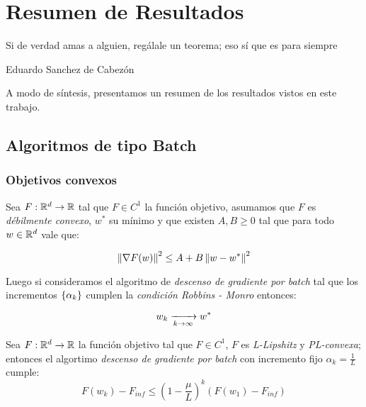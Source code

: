 \chapter{Resumen de Resultados}\label{ch:resumen}

\epigraph{Si de verdad amas a alguien, reg\'alale un teorema; eso s\'i que es para siempre}{Eduardo Sanchez de Cabez\'on}

A modo de s\'intesis, presentamos un resumen de los resultados vistos en este trabajo.

\section{Algoritmos de tipo Batch}

\subsection{Objetivos convexos}

\begin{theorem}
	Sea $F: {\mathbb{R}}^d \rightarrow {\mathbb{R}}$ tal que $F \in C^1$ la funci\'on objetivo, asumamos que $F$ es \textit{d\'ebilmente convexo}, $w^*$ su m\'inimo y que existen $A,B \geq 0$ tal que para todo $w \in {\mathbb{R}}^d$ vale que:
	
	\begin{equation*}
	\left\lVert\nabla F(w)\right\rVert^2 \leq A + B \left\lVert w - w^*\right\rVert^2
	\end{equation*}
	
	Luego si consideramos el algoritmo de \textit{descenso de gradiente por batch} tal que los incrementos $\left\lbrace\alpha_k\right\rbrace$  cumplen la \textit{condici\'on Robbins - Monro} entonces:
	
	\begin{equation*}
	w_k \xrightarrow[k \rightarrow \infty]{} w^*
	\end{equation*}
	
\end{theorem}

\begin{theorem}
	Sea $F: {\mathbb{R}}^d \rightarrow {\mathbb{R}}$ la funci\'on objetivo tal que $F \in C^1$, $F$ es \textit{L-Lipshitz} y \textit{PL-convexa}; entonces el algortimo \textit{descenso de gradiente por batch} con incremento fijo $\alpha_k = \frac{1}{L}$ cumple:
	\begin{equation*}
	F(w_k) - F_{inf} \leq \left(1 - \frac{\mu}{L}\right)^k \left(F(w_1) - F_{inf}\right)
	\end{equation*}
\end{theorem}

